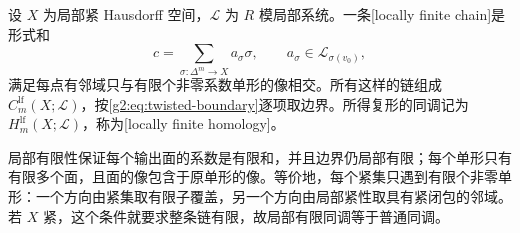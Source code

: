 \begin{definition}[局部有限链]\label{g2:def:locally-finite-chains}
	设 \(X\) 为局部紧 Hausdorff 空间，\(\mathcal L\) 为 \(R\) 模局部系统。一条[locally finite chain]是形式和
	\[
		c=\sum_{\sigma:\Delta^m\to X}a_\sigma\sigma,
		\qquad a_\sigma\in\mathcal L_{\sigma(v_0)},
	\]
	满足每点有邻域只与有限个非零系数单形的像相交。所有这样的链组成 \(C_m^{\mathrm{lf}}(X;\mathcal L)\)，按\eqref{g2:eq:twisted-boundary}逐项取边界。所得复形的同调记为 \(H_m^{\mathrm{lf}}(X;\mathcal L)\)，称为[locally finite homology]。
\end{definition}

局部有限性保证每个输出面的系数是有限和，并且边界仍局部有限；每个单形只有有限多个面，且面的像包含于原单形的像。等价地，每个紧集只遇到有限个非零单形：一个方向由紧集取有限子覆盖，另一个方向由局部紧性取具有紧闭包的邻域。若 \(X\) 紧，这个条件就要求整条链有限，故局部有限同调等于普通同调。

